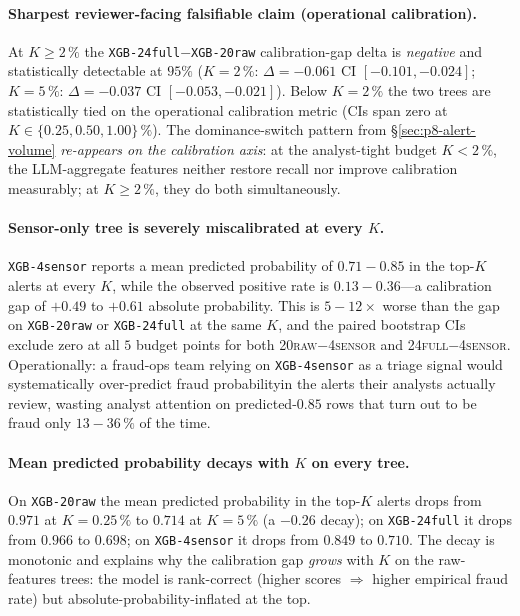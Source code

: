 \documentclass{article}
\begin{document}
\paragraph{Sharpest reviewer-facing falsifiable claim (operational calibration).}
At $K \ge 2\,\%$ the \texttt{XGB-24full}${-}$\texttt{XGB-20raw}
calibration-gap delta is \emph{negative} and statistically detectable at
$95\%$ ($K{=}2\,\%$: $\Delta = -0.061$ CI $[-0.101, -0.024]$;
$K{=}5\,\%$: $\Delta = -0.037$ CI $[-0.053, -0.021]$). Below
$K{=}2\,\%$ the two trees are statistically tied on the operational
calibration metric (CIs span zero at $K \in \{0.25, 0.50, 1.00\}\,\%$).
The dominance-switch pattern from \S\ref{sec:p8-alert-volume}
\emph{re-appears on the calibration axis}: at the analyst-tight budget
$K < 2\,\%$, the LLM-aggregate features neither restore recall nor
improve calibration measurably; at $K \ge 2\,\%$, they do both
simultaneously.

\paragraph{Sensor-only tree is severely miscalibrated at every $K$.}
\texttt{XGB-4sensor} reports a mean predicted probability of
$0.71{-}0.85$ in the top-$K$ alerts at every $K$, while the observed
positive rate is $0.13{-}0.36$---a calibration gap of $+0.49$ to
$+0.61$ absolute probability. This is $5{-}12\times$ worse than the
gap on \texttt{XGB-20raw} or \texttt{XGB-24full} at the same $K$, and
the paired bootstrap CIs exclude zero at all $5$ budget points for both
\textsc{20raw}${-}$\textsc{4sensor} and \textsc{24full}${-}$\textsc{4sensor}.
Operationally: a fraud-ops team relying on \texttt{XGB-4sensor} as a
triage signal would systematically over-predict fraud probabilityin the
alerts their analysts actually review, wasting analyst attention on
predicted-$0.85$ rows that turn out to be fraud only $13{-}36\,\%$ of
the time.

\paragraph{Mean predicted probability decays with $K$ on every tree.}
On \texttt{XGB-20raw} the mean predicted probability in the top-$K$
alerts drops from $0.971$ at $K{=}0.25\,\%$ to $0.714$ at
$K{=}5\,\%$ (a $-0.26$ decay); on \texttt{XGB-24full} it drops from
$0.966$ to $0.698$; on \texttt{XGB-4sensor} it drops from $0.849$ to
$0.710$. The decay is monotonic and explains why the calibration gap
\emph{grows} with $K$ on the raw-features trees: the model is
rank-correct (higher scores $\Rightarrow$ higher empirical fraud rate)
but absolute-probability-inflated at the top.
\end{document}
